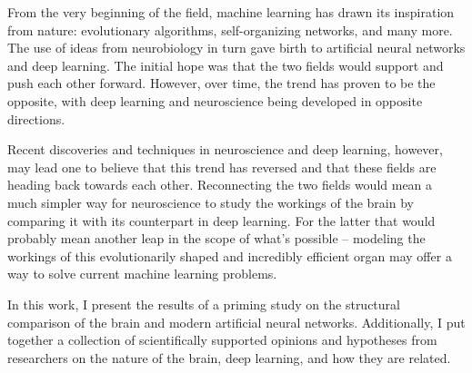 \begin{abstract-en}
    From the very beginning of the field, machine learning has drawn its inspiration from nature: evolutionary algorithms, self-organizing networks, and many more.
    The use of ideas from neurobiology in turn gave birth to artificial neural networks and deep learning.
    The initial hope was that the two fields would support and push each other forward.
    However, over time, the trend has proven to be the opposite, with deep learning and neuroscience being developed in opposite directions.

    Recent discoveries and techniques in neuroscience and deep learning, however, may lead one to believe that this trend has reversed and that these fields are heading back towards each other.
    Reconnecting the two fields would mean a much simpler way for neuroscience to study the workings of the brain by comparing it with its counterpart in deep learning.
    For the latter that would probably mean another leap in the scope of what's possible -- modeling the workings of this evolutionarily shaped and incredibly efficient organ may offer a way to solve current machine learning problems.

    In this work, I present the results of a priming study on the structural comparison of the brain and modern artificial neural networks.
    Additionally, I put together a collection of scientifically supported opinions and hypotheses from researchers on the nature of the brain, deep learning, and how they are related.
\end{abstract-en}